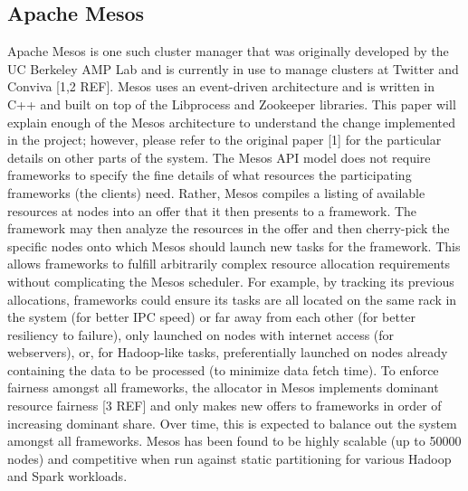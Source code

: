 \subsection{Apache Mesos}
Apache Mesos is one such cluster manager that was originally developed by the UC Berkeley AMP
Lab and is currently in use to manage clusters at Twitter and Conviva [1,2 REF]. Mesos uses an
event-driven architecture and is written in C++ and built on top of the Libprocess and
Zookeeper libraries. This paper will explain enough of the Mesos architecture to understand the
change implemented in the project; however, please refer to the original paper [1] for the
particular details on other parts of the system. The Mesos API model does not require
frameworks to specify the fine details of what resources the participating frameworks (the
clients) need.  Rather, Mesos compiles a listing of available resources at nodes into an offer
that it then presents to a framework. The framework may then analyze the resources in the offer
and then cherry-pick the specific nodes onto which Mesos should launch new tasks for the
framework. This allows frameworks to fulfill arbitrarily complex resource allocation
requirements without complicating the Mesos scheduler. For example, by tracking its previous
allocations, frameworks could ensure its tasks are all located on the same rack in the system
(for better IPC speed) or far away from each other (for better resiliency to failure), only
launched on nodes with internet access (for webservers), or, for Hadoop-like tasks,
preferentially launched on nodes already containing the data to be processed (to minimize data
fetch time). To enforce fairness amongst all frameworks, the allocator in Mesos implements
dominant resource fairness [3 REF] and only makes new offers to frameworks in order of
increasing dominant share. Over time, this is expected to balance out the system amongst all
frameworks. Mesos has been found to be highly scalable (up to 50000 nodes) and competitive when
run against static partitioning for various Hadoop and Spark workloads.

